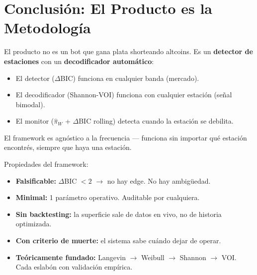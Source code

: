 \documentclass[11pt,a4paper]{article}
\begin{document}
\section{Conclusi\'on: El Producto es la Metodolog\'ia}
\label{sec:conclusion}

\begin{tcolorbox}[key, title=Lo que se vende no es un bot]
El producto no es un bot que gana plata shorteando altcoins. Es un
\textbf{detector de estaciones} con un \textbf{decodificador autom\'atico}:

\begin{itemize}[leftmargin=1.5em]
\item El detector ($\Delta$BIC) funciona en cualquier banda (mercado).
\item El decodificador (Shannon-VOI) funciona con cualquier estaci\'on
  (se\~nal bimodal).
\item El monitor ($\hat{\pi}_W$ + $\Delta$BIC rolling) detecta cuando
  la estaci\'on se debilita.
\end{itemize}

El framework es agn\'ostico a la frecuencia --- funciona sin importar
qu\'e estaci\'on encontr\'es, siempre que haya una estaci\'on.
\end{tcolorbox}

Propiedades del framework:
\begin{itemize}[leftmargin=1.5em]
\item \textbf{Falsificable:} $\Delta$BIC $< 2$ $\to$ no hay edge. No hay ambig\"uedad.
\item \textbf{Minimal:} 1 par\'ametro operativo. Auditable por cualquiera.
\item \textbf{Sin backtesting:} la superficie sale de datos en vivo, no de
  historia optimizada.
\item \textbf{Con criterio de muerte:} el sistema sabe cu\'ando dejar de
  operar.
\item \textbf{Te\'oricamente fundado:} Langevin $\to$ Weibull $\to$
  Shannon $\to$ VOI. Cada eslab\'on con validaci\'on emp\'irica.
\end{itemize}
\end{document}
